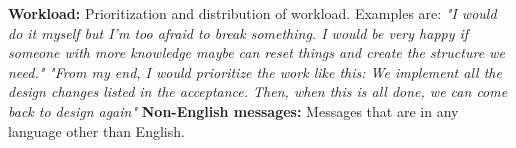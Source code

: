 \documentclass[a4paper,12pt,twoside]{report}
\begin{document}
\textbf{Workload:} Prioritization and distribution of workload. Examples are:
\newline \newline 
\textit{"I would do it myself but I’m too afraid to break something. I would be very happy if someone with more knowledge maybe can reset things and create the structure we need."}
\newline \newline 
\textit{"From my end, I would prioritize the work like this: We implement all the design changes listed in the acceptance. Then, when this is all done, we can come back to design again"}
\newline \newline 
\textbf{Non-English messages:} Messages that are in any language other than English. 

\clearpage

\listoffigures
\clearpage

\listoftables
\clearpage



\end{document}
